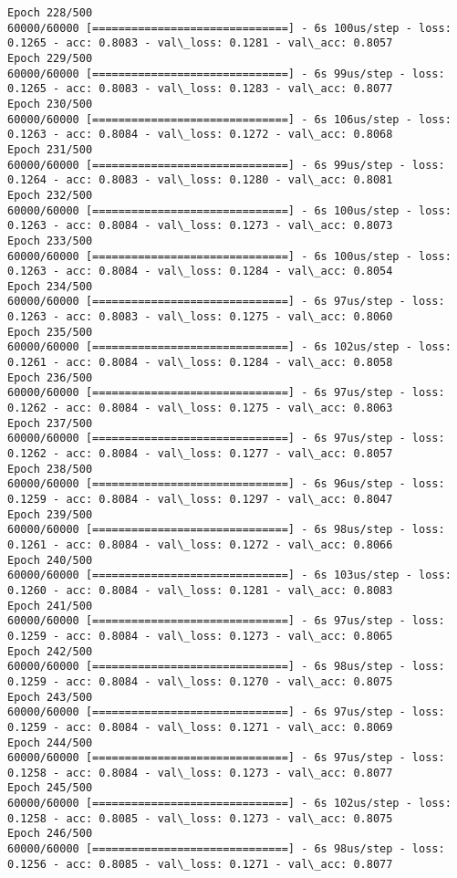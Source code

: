 \documentclass[11pt]{article}
\begin{document}
\begin{Verbatim}[commandchars=\\\{\}]
Epoch 228/500
60000/60000 [==============================] - 6s 100us/step - loss: 0.1265 - acc: 0.8083 - val\_loss: 0.1281 - val\_acc: 0.8057
Epoch 229/500
60000/60000 [==============================] - 6s 99us/step - loss: 0.1265 - acc: 0.8083 - val\_loss: 0.1283 - val\_acc: 0.8077
Epoch 230/500
60000/60000 [==============================] - 6s 106us/step - loss: 0.1263 - acc: 0.8084 - val\_loss: 0.1272 - val\_acc: 0.8068
Epoch 231/500
60000/60000 [==============================] - 6s 99us/step - loss: 0.1264 - acc: 0.8083 - val\_loss: 0.1280 - val\_acc: 0.8081
Epoch 232/500
60000/60000 [==============================] - 6s 100us/step - loss: 0.1263 - acc: 0.8084 - val\_loss: 0.1273 - val\_acc: 0.8073
Epoch 233/500
60000/60000 [==============================] - 6s 100us/step - loss: 0.1263 - acc: 0.8084 - val\_loss: 0.1284 - val\_acc: 0.8054
Epoch 234/500
60000/60000 [==============================] - 6s 97us/step - loss: 0.1263 - acc: 0.8083 - val\_loss: 0.1275 - val\_acc: 0.8060
Epoch 235/500
60000/60000 [==============================] - 6s 102us/step - loss: 0.1261 - acc: 0.8084 - val\_loss: 0.1284 - val\_acc: 0.8058
Epoch 236/500
60000/60000 [==============================] - 6s 97us/step - loss: 0.1262 - acc: 0.8084 - val\_loss: 0.1275 - val\_acc: 0.8063
Epoch 237/500
60000/60000 [==============================] - 6s 97us/step - loss: 0.1262 - acc: 0.8084 - val\_loss: 0.1277 - val\_acc: 0.8057
Epoch 238/500
60000/60000 [==============================] - 6s 96us/step - loss: 0.1259 - acc: 0.8084 - val\_loss: 0.1297 - val\_acc: 0.8047
Epoch 239/500
60000/60000 [==============================] - 6s 98us/step - loss: 0.1261 - acc: 0.8084 - val\_loss: 0.1272 - val\_acc: 0.8066
Epoch 240/500
60000/60000 [==============================] - 6s 103us/step - loss: 0.1260 - acc: 0.8084 - val\_loss: 0.1281 - val\_acc: 0.8083
Epoch 241/500
60000/60000 [==============================] - 6s 97us/step - loss: 0.1259 - acc: 0.8084 - val\_loss: 0.1273 - val\_acc: 0.8065
Epoch 242/500
60000/60000 [==============================] - 6s 98us/step - loss: 0.1259 - acc: 0.8084 - val\_loss: 0.1270 - val\_acc: 0.8075
Epoch 243/500
60000/60000 [==============================] - 6s 97us/step - loss: 0.1259 - acc: 0.8084 - val\_loss: 0.1271 - val\_acc: 0.8069
Epoch 244/500
60000/60000 [==============================] - 6s 97us/step - loss: 0.1258 - acc: 0.8084 - val\_loss: 0.1273 - val\_acc: 0.8077
Epoch 245/500
60000/60000 [==============================] - 6s 102us/step - loss: 0.1258 - acc: 0.8085 - val\_loss: 0.1273 - val\_acc: 0.8075
Epoch 246/500
60000/60000 [==============================] - 6s 98us/step - loss: 0.1256 - acc: 0.8085 - val\_loss: 0.1271 - val\_acc: 0.8077

\end{Verbatim}
\end{document}
